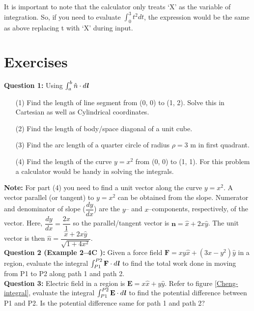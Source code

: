 \documentclass[12pt,a4paper]{article}
\begin{document}
It is important to note that the calculator only treats `X' as the variable of integration. So, if you need to evaluate $\int_{0}^{3}t^2dt$, the expression would be the same as above replacing t with `X' during input.
\section{Exercises}
\noindent\textbf{Question 1:} Using $\int_{a}^{b}\hat n\cdot d\textbf{\textit{l}}$
\begin{itemize}
\item[(1)] Find the length of line segment from (0, 0) to (1, 2). Solve this in Cartesian as well as Cylindrical coordinates.
\item[(2)] Find the length of body/space diagonal of a unit cube.
\item[(3)] Find the arc length of a quarter circle of radius $\rho=3$ m in first quadrant.
\item[(4)] Find the length of the curve $y=x^2$ from (0, 0) to (1, 1). For this problem a calculator would be handy in solving the integrals.
\end{itemize}
\noindent\textbf{Note:} For part (4) you need to find a unit vector along the curve $y=x^2$. A vector parallel (or tangent) to $y=x^2$ can be obtained from the slope. Numerator and denominator of slope ($\dfrac{dy}{dx}$) are the $y$-- and $x$--components, respectively, of the vector. Here, $\dfrac{dy}{dx}=\dfrac{2x}{1}$ so the parallel/tangent vector is $\textbf{n}=\hat x+2x\hat y$. The unit vector is then $\hat n=\dfrac{\hat x+2x\hat y}{\sqrt{1+4x^2}}$.\\[0.2cm]
\noindent\textbf{Question 2 (Example 2--4C \cite[Example 2--4, page 23]{Cheng}):} Given a force field $\textbf{F}=xy\hat x+(3x-y^2)\hat y$ in a region, evaluate the integral $\int_{P1}^{P2}\textbf{F}\cdot d\textbf{\textit{l}}$ to find the total work done in moving from P1 to P2 along path 1 and path 2.\\[0.2cm]
\noindent\textbf{Question 3:} Electric field in a region is $\textbf{E}=x\hat x+y\hat y$. Refer to figure \ref{Cheng-integral}, evaluate the integral $\int_{P1}^{P2}\textbf{E}\cdot d\textbf{\textit{l}}$ to find the potential difference between P1 and P2. Is the potential difference same for path 1 and path 2?
\end{document}

